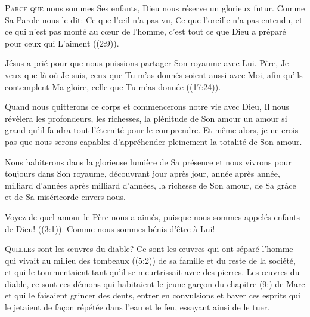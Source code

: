\lettrine{P}{arce que} nous sommes Ses enfants,
 Dieu nous réserve un glorieux futur.
 Comme Sa Parole nous le dit: 
 \Og Ce que l'\oe{}il n'a pas vu, Ce que l'oreille n'a pas entendu,
 et ce qui n'est pas monté au c\oe{}ur de l'homme,
 c'est tout ce que Dieu a préparé pour ceux qui L'aiment \Fg{}
 ((2:9)). 

Jésus a prié pour que nous puissions partager Son royaume avec Lui.
 \Og Père, Je veux que là où Je suis, ceux que Tu m'as donnés
 soient aussi avec Moi, afin qu'ils contemplent Ma gloire,
 celle que Tu m'as donnée \Fg{} ((17:24)). 


Quand nous quitterons ce corps et commencerons notre vie avec Dieu,
 Il nous révèlera les profondeurs, les richesses, la plénitude de Son amour
 \ocadr un amour si grand qu'il faudra tout l'éternité pour le comprendre.
 Et même alors, je ne crois pas que nous serons capables d'appréhender
 pleinement la totalité de Son amour. 

Nous habiterons dans la glorieuse lumière de Sa présence et nous vivrons
 pour toujours dans Son royaume, découvrant jour après jour,
 année après année, milliard d'années après milliard d'années,
 la richesse de Son amour, de Sa grâce et de Sa miséricorde envers nous. 

\Og Voyez de quel amour le Père nous a aimés, puisque nous sommes appelés
 enfants de Dieu! \Fg{} ((3:1)).
 Comme nous sommes bénis d'être à Lui! 

\dvrule







\lettrine{Q}{uelles} sont les \oe{}uvres du diable?
 Ce sont les \oe{}uvres qui ont séparé l'homme qui vivait
 au milieu des tombeaux ((5:2)) de sa famille
 et du reste de la société, et qui le tourmentaient tant
 qu'il se meurtrissait avec des pierres.
 Les \oe{}uvres du diable, ce sont ces démons qui habitaient le jeune gar\c{c}on
 du chapitre (9:) de Marc et qui le faisaient grincer des dents,
 entrer en convulsions et baver \ocadr ces esprits qui le jetaient
 de fa\c{c}on répétée dans l'eau et le feu, essayant ainsi de le tuer. 

